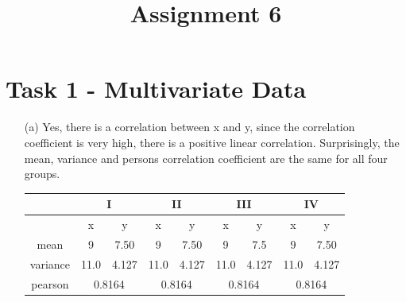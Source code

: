 \documentclass[a4paper]{article}
\date{}
\author{}
\title{\textbf{Assignment 6}}
\begin{document}
\maketitle 
\thispagestyle{fancy}

\section*{Task 1 - Multivariate Data}

\begin{enumerate}
	\item[(a)]
	Yes, there is a correlation between x and y, since the correlation coefficient is very high, there is a positive linear correlation. 
	Surprisingly, the mean, variance and persons correlation coefficient are the same for all four groups. 
	
	
	\begin{tabular}{| c |c c | c c | c c | c c|} \hline
		&\multicolumn{2}{|c|}{I} & \multicolumn{2}{|c|}{II} &
		\multicolumn{2}{c|}{III} & \multicolumn{2}{|c|}{IV} \\ \hline
		&x & y & x & y & x & y & x & y\\ \hline 
		mean & 9 & 7.50 &9 &7.50&9&7.5&9&7.50\\ \hline 
		variance & 11.0 & 4.127 & 11.0 & 4.127  & 11.0 & 4.127 & 11.0 & 4.127 \\ \hline
		pearson & \multicolumn{2}{|c|}{0.8164}  &   \multicolumn{2}{|c|}{0.8164} &  
		 \multicolumn{2}{|c|}{0.8164}  &   \multicolumn{2}{|c|}{0.8164} \\ \hline  
		
	\end{tabular}


\end{enumerate}
\end{document}
